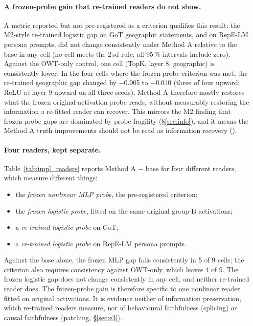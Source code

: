\paragraph{A frozen-probe gain that re-trained readers do not show.} A metric reported but not pre-registered as a
criterion qualifies this result: the M2-style re-trained logistic gap on GoT geographic statements, and on RepE-LM
persona prompts, did not change consistently under Method A relative to the base in any cell (no cell meets the 2\,sd
rule; all 95\,\% intervals include zero). Against the OWT-only control, one cell (TopK, layer 8, geographic) is
consistently lower. In the four cells where the frozen-probe criterion was met, the re-trained geographic gap changed
by $-$0.005 to $+$0.010 (three of four upward; ReLU at layer 9 upward on all three seeds). Method A therefore mostly restores what the frozen original-activation probe reads, without measurably restoring the information a
re-fitted reader can recover. This mirrors the M2 finding that frozen-probe gaps are dominated by probe fragility
(\S\ref{sec:info}), and it means the Method A truth improvements should not be read as information recovery
().

\paragraph{Four readers, kept separate.} Table~\ref{tab:impl_readers} reports Method A $-$ base for four different
readers, which measure different things:
\begin{itemize}
  \item the \emph{frozen nonlinear MLP probe}, the pre-registered criterion;
  \item the \emph{frozen logistic probe}, fitted on the same original group-B activations;
  \item a \emph{re-trained logistic probe} on GoT;
  \item a \emph{re-trained logistic probe} on RepE-LM persona prompts.
\end{itemize}
Against the base alone, the frozen MLP gap falls consistently in 5 of 9 cells; the criterion also requires
consistency against OWT-only, which leaves 4 of 9. The frozen logistic gap does not change consistently in any cell,
and neither re-trained reader does. The frozen-probe gain is therefore specific to one nonlinear reader fitted on
original activations. It is evidence neither of information preservation, which re-trained readers measure, nor of
behavioural faithfulness (splicing) or causal faithfulness (patching, \S\ref{sec:e3}).

